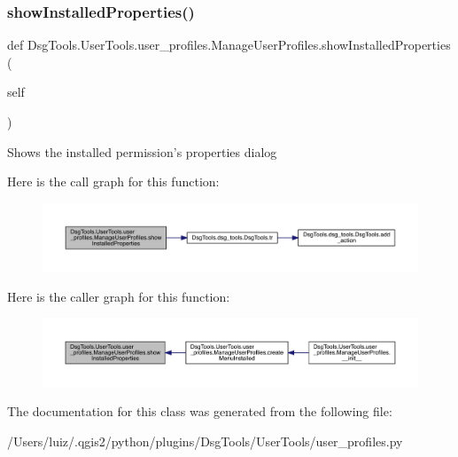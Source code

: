 \subsubsection{\texorpdfstring{show\+Installed\+Properties()}{showInstalledProperties()}}
{\footnotesize\ttfamily def Dsg\+Tools.\+User\+Tools.\+user\+\_\+profiles.\+Manage\+User\+Profiles.\+show\+Installed\+Properties (\begin{DoxyParamCaption}\item[{}]{self }\end{DoxyParamCaption})}

\begin{DoxyVerb}Shows the installed permission's properties dialog
\end{DoxyVerb}
 Here is the call graph for this function\+:
\nopagebreak
\begin{figure}[H]
\begin{center}
\leavevmode
\includegraphics[width=350pt]{class_dsg_tools_1_1_user_tools_1_1user__profiles_1_1_manage_user_profiles_a1beec4e431f3526c6f4efb5bcefca57d_cgraph}
\end{center}
\end{figure}
Here is the caller graph for this function\+:
\nopagebreak
\begin{figure}[H]
\begin{center}
\leavevmode
\includegraphics[width=350pt]{class_dsg_tools_1_1_user_tools_1_1user__profiles_1_1_manage_user_profiles_a1beec4e431f3526c6f4efb5bcefca57d_icgraph}
\end{center}
\end{figure}


The documentation for this class was generated from the following file\+:\begin{DoxyCompactItemize}
\item 
/\+Users/luiz/.\+qgis2/python/plugins/\+Dsg\+Tools/\+User\+Tools/user\+\_\+profiles.\+py\end{DoxyCompactItemize}
